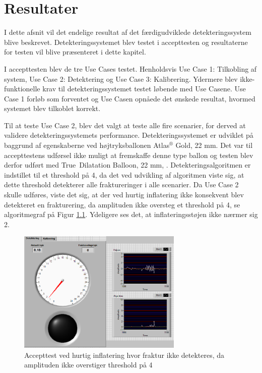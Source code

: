 \chapter{Resultater} \label{resultat}

I dette afsnit vil det endelige resultat af det færdigudviklede detekteringssystem blive beskrevet. Detekteringssystemet blev testet i accepttesten og resultaterne for testen vil blive præsenteret i dette kapitel. 

I accepttesten blev de tre Use Cases testet. Henholdsvis Use Case 1: Tilkobling af system, Use Case 2: Detektering og Use Case 3: Kalibrering. Ydermere blev ikke-funktionelle krav til detekteringssystemet testet løbende med Use Casene. Use Case 1 forløb som forventet og Use Casen opnåede det ønskede resultat, hvormed systemet blev tilkoblet korrekt.  

Til at teste Use Case 2, blev det valgt at teste alle fire scenarier, for derved at validere detekteringssystemets performance. Detekteringssystemet er udviklet på baggrund af egenskaberne ved højtryksballonen Atlas$^\circledR$ Gold, 22 mm. Det var til accepttestens udførsel ikke muligt at fremskaffe denne type ballon og testen blev derfor udført med True\texttrademark \ Dilatation Balloon, 22 mm, \cite{DatabladTrue}. Detekteringsalgoritmen er indstillet til et threshold på 4, da det ved udvikling af algoritmen viste sig, at dette threshold detekterer alle fraktureringer i alle scenarier. Da Use Case 2 skulle udføres, viste det sig, at der ved hurtig inflatering ikke konsekvent blev detekteret en frakturering, da amplituden ikke oversteg et threshold på 4, se algoritmegraf på Figur \ref{alg2}. Ydeligere ses det, at inflateringsstøjen ikke nærmer sig 2. 

\begin{figure}[H]
	\centering
	\includegraphics[width=0.7\textwidth]{Figure/alg2}
	\caption{Accepttest ved hurtig inflatering hvor fraktur ikke detekteres, da amplituden ikke overstiger threshold på 4}
    \label{alg2}
\end{figure}

